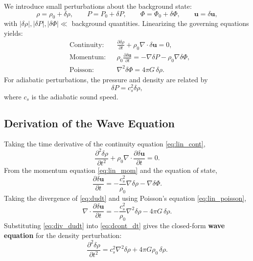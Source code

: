 We introduce small perturbations about the background state:
\begin{equation}
\rho = \rho_0 + \delta\rho, 
\qquad 
P = P_0 + \delta P, 
\qquad 
\Phi = \Phi_0 + \delta\Phi, 
\qquad 
\mathbf{u} = \delta\mathbf{u},
\end{equation}
with $|\delta\rho|, |\delta P|, |\delta\Phi| \ll$ background quantities.  
Linearizing the governing equations yields:
\begin{align}
&\text{Continuity:} && 
\frac{\partial \delta\rho}{\partial t} + \rho_0 \nabla\cdot\delta\mathbf{u} = 0, 
\label{eq:lin_cont} \\[4pt]
&\text{Momentum:} && 
\rho_0 \frac{\partial \delta\mathbf{u}}{\partial t} 
= - \nabla \delta P - \rho_0 \nabla \delta\Phi, 
\label{eq:lin_mom} \\[4pt]
&\text{Poisson:} && 
\nabla^2 \delta\Phi = 4\pi G\,\delta\rho.
\label{eq:lin_poisson}
\end{align}
For adiabatic perturbations, the pressure and density are related by
\begin{equation}
\delta P = c_s^2 \delta\rho,
\end{equation}
where $c_s$ is the adiabatic sound speed.

\subsection*{Derivation of the Wave Equation}

Taking the time derivative of the continuity equation \eqref{eq:lin_cont},
\begin{equation}
\frac{\partial^2 \delta\rho}{\partial t^2} + \rho_0 \nabla\cdot\frac{\partial \delta\mathbf{u}}{\partial t} = 0.
\label{eq:dcont_dt}
\end{equation}
From the momentum equation \eqref{eq:lin_mom} and the equation of state,
\begin{equation}
\frac{\partial \delta\mathbf{u}}{\partial t}
= -\frac{c_s^2}{\rho_0}\nabla\delta\rho - \nabla\delta\Phi.
\label{eq:dudt}
\end{equation}
Taking the divergence of \eqref{eq:dudt} and using Poisson’s equation \eqref{eq:lin_poisson},
\begin{equation}
\nabla\cdot\frac{\partial \delta\mathbf{u}}{\partial t}
= -\frac{c_s^2}{\rho_0}\nabla^2\delta\rho - 4\pi G\,\delta\rho.
\label{eq:div_dudt}
\end{equation}
Substituting \eqref{eq:div_dudt} into \eqref{eq:dcont_dt} gives the closed-form \textbf{wave equation} for the density perturbation:
\begin{equation}
\boxed{
\frac{\partial^2 \delta\rho}{\partial t^2}
= c_s^2 \nabla^2 \delta\rho + 4\pi G \rho_0\,\delta\rho.
}
\label{eq:jeans_wave}
\end{equation}

